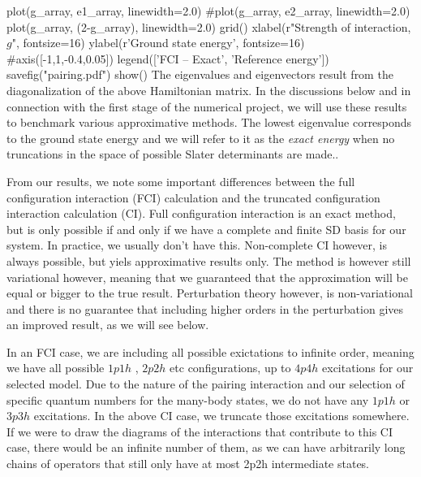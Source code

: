 \documentclass[%
twoside,                 %
final,                   %
10pt]{article}
\newenvironment{doconceexercise}{}{}
\begin{document}
\begin{doconceexercise}
plot(g_array, e1_array, linewidth=2.0)
#plot(g_array, e2_array, linewidth=2.0)
plot(g_array, (2-g_array), linewidth=2.0)
grid()
xlabel(r"Strength of interaction, $g$", fontsize=16)
ylabel(r'Ground state energy', fontsize=16)
#axis([-1,1,-0.4,0.05])
legend(['FCI -- Exact', 'Reference energy'])
savefig("pairing.pdf")
show()
\epypro
The eigenvalues and eigenvectors result from the diagonalization of the above Hamiltonian matrix.
In the discussions below and in connection with the first stage of the numerical project, we will use these results to benchmark various approximative methods. 
The lowest eigenvalue corresponds to the ground state
energy and we will refer to it as the \emph{exact energy} when no truncations in the space of possible Slater determinants are made..

From our results, we note some important differences between the full configuration interaction (FCI)
calculation and the truncated configuration interaction calculation (CI).
Full configuration interaction is an exact method, but is only
possible if and only if we have a complete and finite SD basis for our
system. In practice, we usually don't have this. Non-complete
CI however, is always possible, but yiels   approximative
results only. The method is however still variational however, meaning that we 
guaranteed that the approximation will be equal or bigger to the true
result. 
Perturbation theory however, is non-variational and there is no guarantee that including higher orders in the 
perturbation gives an improved result, as we will see below.

In an FCI case, we are including all possible exictations to infinite
order, meaning we have all possible $1p1h$ , $2p2h$ etc configurations, up to $4p4h$ 
excitations for our selected model. Due to the nature of the pairing interaction and our selection
of specific quantum numbers for the many-body states, we do not have any $1p1h$ or $3p3h$ excitations.
In the above CI case, we truncate those excitations somewhere. 
If we
were to draw the diagrams of the interactions that contribute to this
CI case, there would be an infinite number of them, as we can have
arbitrarily long chains of operators that still only have at most 2p2h
intermediate states.



\end{doconceexercise}
\end{document}
